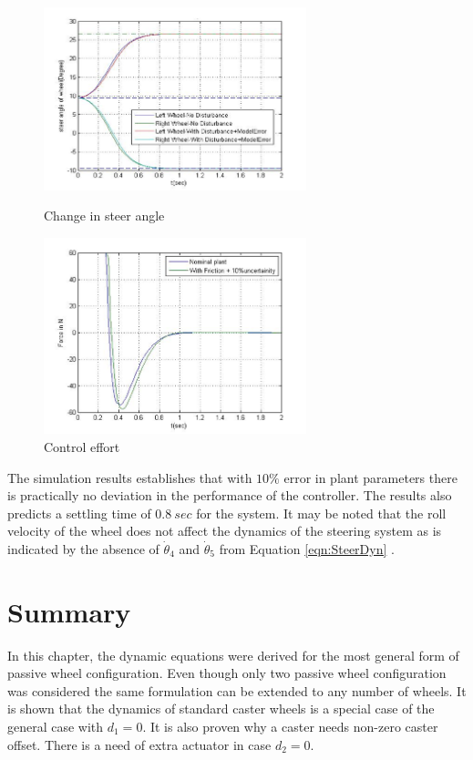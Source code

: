  
\begin{figure}
	\begin{minipage}[t]{0.5\textwidth}
		\centering
		\includegraphics[width=3in]{Chapter4/fig/SteeringPos} 
		\caption{Change in steer angle}\label{fig:SteerPos}
	\end{minipage}
	\hfill
	\begin{minipage}[t]{0.5\textwidth}
		\centering
		\includegraphics[width=3in]{Chapter4/fig/SteerEffort} 
		\caption{Control effort}\label{fig:SteerEfort}
	\end{minipage}
\end{figure} 
The simulation results establishes that with $10\%$ error in plant parameters there is practically no deviation in the performance of the controller. The results also predicts a settling time of $0.8~sec$ for the system. It may be noted that the roll velocity of the wheel does not affect the dynamics of the steering system as is indicated by the absence of $\dot\theta_4$ and $\dot\theta_5$  from Equation \ref{eqn:SteerDyn} .
\section{Summary}
In this chapter, the dynamic equations were derived for  the most general form of passive wheel configuration. Even though  only two passive wheel configuration was considered the same formulation can be extended to any number of  wheels. It is shown that the  dynamics of standard caster wheels is a special case of the  general case with $d_1=0$. It is also proven why a caster needs  non-zero caster offset. There is a  need of extra actuator in case $d_2=0$. 

